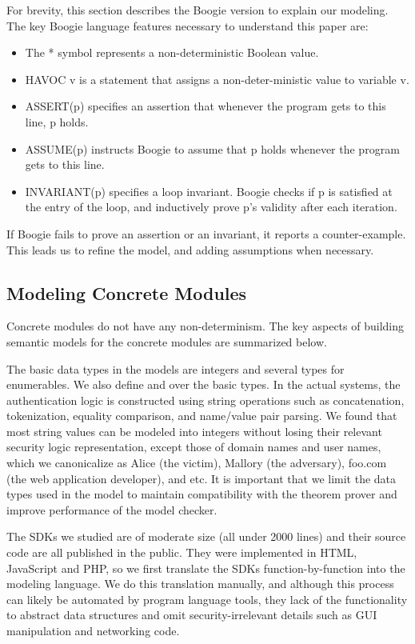 For brevity, this section describes the Boogie version to explain our modeling.  The key Boogie language features necessary to understand this paper are:

\begin{itemize}

\item The * symbol represents a non-deterministic Boolean value. 
\item HAVOC v is a statement that assigns a non-deter-ministic value to variable v.
\item ASSERT(p) specifies an assertion that whenever the program gets to this line, p holds. 
\item ASSUME(p) instructs Boogie to assume that p holds whenever the program gets to this line. 
\item INVARIANT(p) specifies a loop invariant. Boogie checks if p is satisfied at the entry of the loop, and inductively prove p's validity after each iteration. 

\end{itemize}

If Boogie fails to prove an assertion or an invariant, it reports a counter-example. This leads us to refine the model, and adding assumptions when necessary. 

\subsection{Modeling Concrete Modules}

Concrete modules do not have any non-determinism. The key aspects of building semantic models for the concrete modules are summarized below.

  The basic data types in the models are integers and several types for enumerables.  We also define  and  over the basic types.  In the actual systems, the authentication logic is constructed using string operations such as concatenation, tokenization, equality comparison, and name/value pair parsing.  We found that most string values can be modeled into integers without losing their relevant security logic representation, except those of domain names and user names, which we canonicalize as Alice (the victim), Mallory (the adversary), foo.com (the web application developer), and etc.  It is important that we limit the data types used in the model to maintain compatibility with the theorem prover and improve performance of the model checker.

  The SDKs we studied are of moderate size (all under 2000 lines) and their source code are all published in the public.  They were implemented in HTML, JavaScript and PHP, so we first translate the SDKs function-by-function into the modeling language.  We do this translation manually, and although this process can likely be automated by program language tools, they lack of the functionality to abstract data structures and omit security-irrelevant details such as GUI manipulation and networking code.

